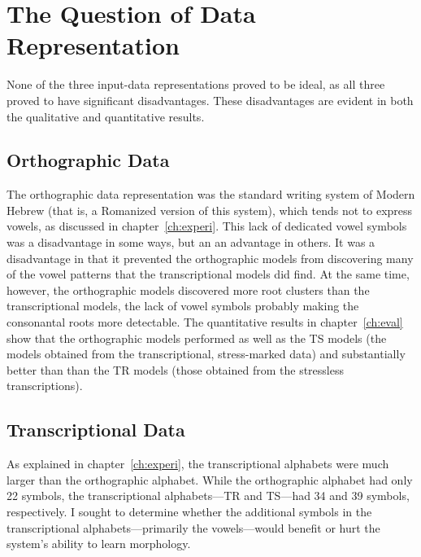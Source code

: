 \section{The Question of Data Representation}\label{sec:concl-data-rep}
None of the three input-data representations proved to be ideal, as 
all three proved to have significant disadvantages.
These disadvantages
are evident in both the qualitative and quantitative results.
\subsection{Orthographic Data}
The orthographic data representation was the standard writing system of Modern Hebrew
(that is, a Romanized version of this system), which tends not to express vowels,
as discussed in chapter~\ref{ch:experi}. This lack of dedicated vowel symbols was a disadvantage in some ways, but an an advantage in others. It was a disadvantage in that it
prevented the orthographic models from discovering many of the vowel patterns that the transcriptional models
did find. 
At the same time, however, the orthographic models discovered more root clusters than the transcriptional models, the lack of vowel symbols probably making the consonantal roots more detectable. 
The quantitative results in chapter~\ref{ch:eval} show that the orthographic models performed 
as well as the TS models (the models obtained from the transcriptional, stress-marked data) and substantially better than
than the TR models (those obtained from the stressless transcriptions).

\subsection{Transcriptional Data} \label{sec:concl-trans-data}
As explained in chapter~\ref{ch:experi}, the transcriptional alphabets were much larger than the orthographic alphabet.
While the orthographic alphabet had only 22 symbols, the transcriptional alphabets---TR and TS---had 34 and 39 symbols, respectively. 
I sought to determine whether the additional symbols in the transcriptional alphabets---primarily the vowels---would benefit or hurt the system's ability to learn morphology.


